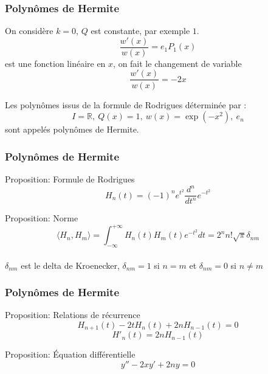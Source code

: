 \documentclass[xcolor=dvipsnames,10pt,mathserif]{beamer}
\theoremstyle{plain}
\newcommand{\la}{\langle}
\newcommand{\ra}{\rangle}
\newcommand{\R}{\mathbb{R}}
\begin{document}
\begin{frame}\frametitle{Polynômes de Hermite \hfill \insertpagenumber}
On considère $k=0$, $Q$ est constante, par exemple $1$. 
\begin{equation}
\dfrac{w'(x)}{w(x)}=e_{1}P_{1}(x)
\end{equation}
est une fonction linéaire en $x$, on fait le changement de variable 
\begin{equation}
\dfrac{w'(x)}{w(x)}=-2x
\end{equation}
\begin{block}{}
Les polynômes issus de la formule de Rodrigues déterminée par :
\begin{equation}
I=\R,\ Q(x)=1,\  w(x)=\exp(-x^{2}),\ e_{n}
\end{equation}
sont appelés polynômes de Hermite.
\end{block}
\end{frame}


\begin{frame}\frametitle{Polynômes de Hermite \hfill \insertpagenumber}
\begin{block}{Proposition: Formule de Rodrigues}
\begin{equation}
H_{n}(t)=(-1)^{n}e^{t^{2}}\dfrac{d^{n}}{dt^{n}}e^{-t^{2}}
\end{equation}
\end{block}
\pause
\begin{block}{Proposition: Norme}
\begin{equation}
\la H_{n},H_{m} \ra=\int_{-\infty}^{+\infty}H_{n}(t)H_{m}(t)e^{-t^{2}}dt=2^{n}n!\sqrt{\pi}\delta_{nm}
\end{equation}
\\$\delta_{nm}$ est le delta de Kroenecker, $\delta_{nm}=1$ si $n=m$ et $\delta_{nm}=0$ si $n \neq m$
\end{block}
\end{frame}


\begin{frame}\frametitle{Polynômes de Hermite \hfill \insertpagenumber}
\begin{block}{Proposition: Relations de récurrence}
\begin{equation}
H_{n+1}(t)-2tH_{n}(t)+2nH_{n-1}(t)=0
\end{equation}
\begin{equation}
{H'}_{n}(t) = 2nH_{n-1}(t)
\end{equation}
\end{block}
\pause
\begin{block}{Proposition: Équation différentielle}
\begin{equation}
y''-2xy'+2ny = 0
\end{equation}
\end{block}
\end{frame}
\end{document}
